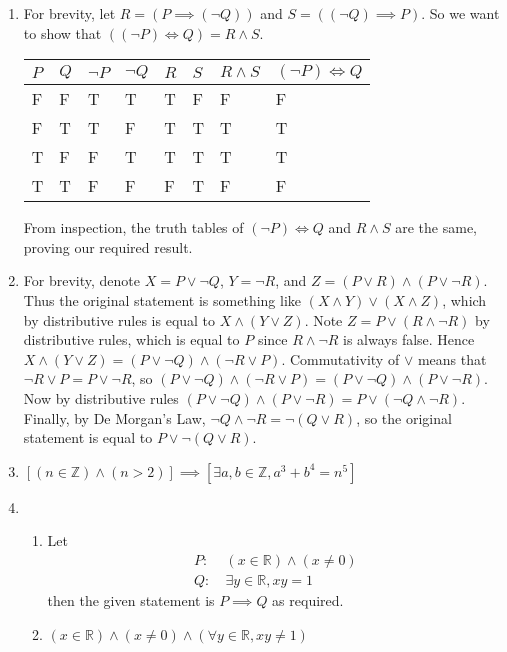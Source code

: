 \begin{enumerate}
    \item For brevity, let $R = (P \implies (\lnot Q))$ and $S = ((\lnot Q) \implies P)$. So we want to show that $((\lnot P) \iff Q) = R \land S$.
    \begin{table}[h]
        \centering
        \begin{tabular}{|l|l||l|l|l|l||l|l|}
            \hline
            $P$ & $Q$ & $\lnot P$ & $\lnot Q$ & $R$ & $S$ & $R \land S$ & $(\lnot P) \iff Q$ \\ \hline
            F   & F   & T         & T         & T   & F   & F           & F                  \\ \hline
            F   & T   & T         & F         & T   & T   & T           & T                  \\ \hline
            T   & F   & F         & T         & T   & T   & T           & T                  \\ \hline
            T   & T   & F         & F         & F   & T   & F           & F                  \\ \hline
        \end{tabular}
    \end{table}

    From inspection, the truth tables of $(\lnot P) \iff Q$ and $R \land S$ are the same, proving our required result.
    
    \item For brevity, denote $X = P \lor \lnot Q$, $Y = \lnot R$, and $Z = (P \lor R) \land (P \lor \lnot R)$. Thus the original statement is something like $(X \land Y) \lor (X \land Z)$, which by distributive rules is equal to $X \land (Y \lor Z)$. Note $Z = P \lor (R \land \lnot R)$ by distributive rules, which is equal to $P$ since $R \land \lnot R$ is always false. Hence $X \land (Y \lor Z) = (P \lor \lnot Q) \land (\lnot R \lor P)$. Commutativity of $\lor$ means that $\lnot R \lor P = P \lor \lnot R$, so $(P \lor \lnot Q) \land (\lnot R \lor P) = (P \lor \lnot Q) \land (P \lor \lnot R)$. Now by distributive rules $(P \lor \lnot Q) \land (P \lor \lnot R) = P \lor (\lnot Q \land \lnot R)$. Finally, by De Morgan's Law, $\lnot Q \land \lnot R = \lnot(Q \lor R)$, so the original statement is equal to $P \lor \lnot(Q \lor R)$.
    
    \item $\left[(n \in \mathbb{Z}) \land (n > 2)\right] \implies \left[\exists a, b \in \mathbb{Z}, a^3 + b^4 = n^5\right]$
    
    \item \begin{enumerate}[label=(\roman*)]
        \item Let
        \begin{align*}
            P:&\ (x \in \mathbb{R}) \land (x \neq 0)\\
            Q:&\ \exists y \in \mathbb{R}, xy = 1
        \end{align*}
        then the given statement is $P \implies Q$ as required.
        \item $(x \in \mathbb{R}) \land (x \neq 0) \land (\forall y \in \mathbb{R}, xy \neq 1)$
    \end{enumerate}
    

\end{enumerate}
